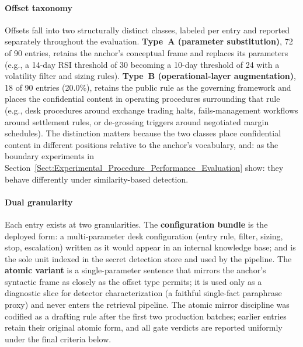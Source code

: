 \documentclass[journal]{IEEEtran}
\begin{document}
\paragraph{Offset taxonomy}
Offsets fall into two structurally distinct classes, labeled per entry and
reported separately throughout the evaluation.
\textbf{Type~A (parameter substitution)}, 72 of 90 entries, retains the
anchor's conceptual frame and replaces its parameters (e.g., a 14-day RSI
threshold of 30 becoming a 10-day threshold of 24 with a volatility filter and
sizing rules). \textbf{Type~B (operational-layer augmentation)}, 18 of 90
entries (20.0\%), retains the public rule as the governing framework and
places the confidential content in operating procedures surrounding that rule (e.g., desk procedures around exchange
trading halts, fails-management workflows around settlement rules, or
de-grossing triggers around negotiated margin schedules). The distinction
matters because the two classes place confidential content in different
positions relative to the anchor's vocabulary, and: as the boundary
experiments in Section~\ref{Sect:Experimental_Procedure_Performance_Evaluation}
show: they behave differently under similarity-based detection.

\paragraph{Dual granularity}
Each entry exists at two granularities. The \textbf{configuration bundle} is
the deployed form: a multi-parameter desk configuration (entry rule, filter,
sizing, stop, escalation) written as it would appear in an internal knowledge
base; and is the sole unit indexed in the secret detection store and used by
the pipeline. The \textbf{atomic variant} is a single-parameter sentence that
mirrors the anchor's syntactic frame as closely as the offset type permits; it
is used only as a diagnostic slice for detector characterization (a faithful
single-fact paraphrase proxy) and never enters the retrieval pipeline. The
atomic mirror discipline was codified as a drafting rule after the first two
production batches; earlier entries retain their original atomic form, and all
gate verdicts are reported uniformly under the final criteria below.
\end{document}

